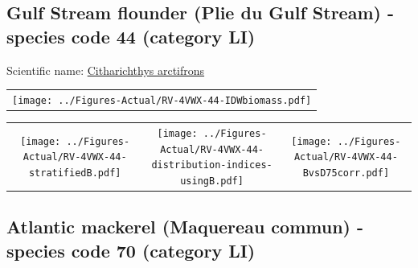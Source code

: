 \documentclass[12pt]{article}\usepackage[]{graphicx}\usepackage[]{color}
\begin{document}
\renewcommand\thefigure{\thesubsection\Alph{figure}}

\setcounter{figure}{0}

\hypertarget{sec:44}{%
\subsection{Gulf Stream flounder (Plie du Gulf Stream) - species code 44 (category LI)}\label{sec:44}}

  


Scientific name: \href{http://www.marinespecies.org/aphia.php?p=taxdetails\&id=158791}{Citharichthys arctifrons} \newline
\begin{minipage}{1.0\textwidth}
 \begin{tabular}{c}
\texttt{[image: ../Figures-Actual/RV-4VWX-44-IDWbiomass.pdf]} \\ 
\end{tabular} 
\end{minipage}
\newline

\vspace{1cm}
\begin{minipage}{1.0\textwidth}
 \begin{tabular}{ccc}
\texttt{[image: ../Figures-Actual/RV-4VWX-44-stratifiedB.pdf]} & 
\texttt{[image: ../Figures-Actual/RV-4VWX-44-distribution-indices-usingB.pdf]} & 
\texttt{[image: ../Figures-Actual/RV-4VWX-44-BvsD75corr.pdf]} \\ 
\end{tabular} 
\end{minipage}
\clearpage

\renewcommand\thefigure{\thesubsection\Alph{figure}}

\setcounter{figure}{0}

\hypertarget{sec:70}{%
\subsection{Atlantic mackerel (Maquereau commun) - species code 70 (category LI)}\label{sec:70}}
\end{document}
